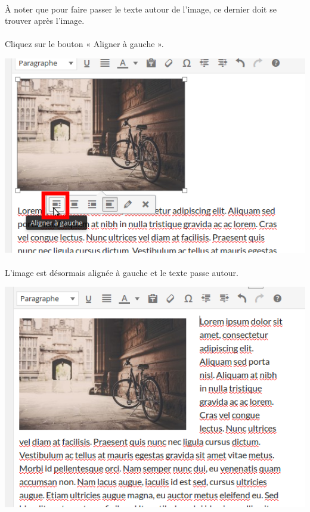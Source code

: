 \documentclass[10pt,a4paper]{article}
\begin{document}
\paragraph{}À noter que pour faire passer le texte autour de l'image, ce dernier doit se trouver après l'image.
\paragraph{}Cliquez sur le bouton « Aligner à gauche ».
\begin{center}
\includegraphics[scale=0.3]{img/0110.png}
\end{center}
\paragraph{}L'image est désormais alignée à gauche et le texte passe autour.
\begin{center}
\includegraphics[scale=0.3]{img/0111.png}
\end{center}
\end{document}
